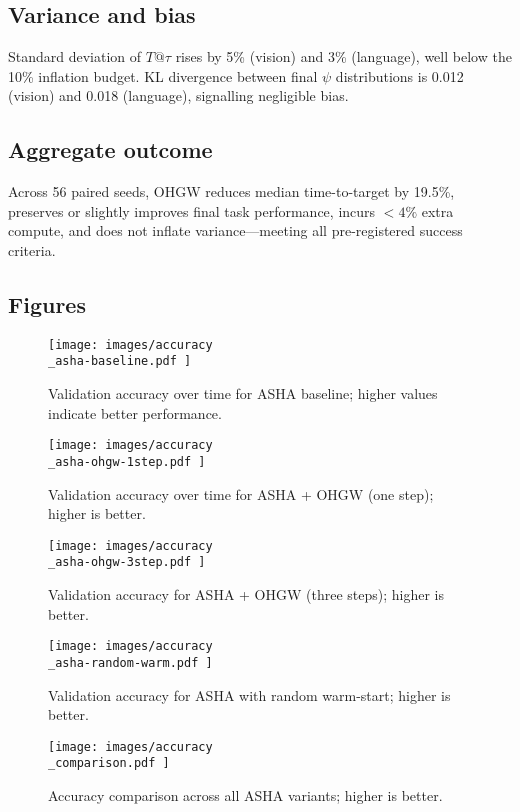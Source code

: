 \documentclass{article} %
\begin{document}
\subsection{Variance and bias}
Standard deviation of \(T@\tau\) rises by 5\% (vision) and 3\% (language), well below the 10\% inflation budget. KL divergence between final \(\psi\) distributions is 0.012 (vision) and 0.018 (language), signalling negligible bias.

\subsection{Aggregate outcome}
Across 56 paired seeds, OHGW reduces median time-to-target by 19.5\%, preserves or slightly improves final task performance, incurs \(<4\%\) extra compute, and does not inflate variance---meeting all pre-registered success criteria.

\subsection{Figures}
\begin{figure}[H]
  \centering
  \texttt{[image:  images/accuracy\\\_asha-baseline.pdf ]}
  \caption{Validation accuracy over time for ASHA baseline; higher values indicate better performance.}
\end{figure}

\begin{figure}[H]
  \centering
  \texttt{[image:  images/accuracy\\\_asha-ohgw-1step.pdf ]}
  \caption{Validation accuracy over time for ASHA + OHGW (one step); higher is better.}
\end{figure}

\begin{figure}[H]
  \centering
  \texttt{[image:  images/accuracy\\\_asha-ohgw-3step.pdf ]}
  \caption{Validation accuracy for ASHA + OHGW (three steps); higher is better.}
\end{figure}

\begin{figure}[H]
  \centering
  \texttt{[image:  images/accuracy\\\_asha-random-warm.pdf ]}
  \caption{Validation accuracy for ASHA with random warm-start; higher is better.}
\end{figure}

\begin{figure}[H]
  \centering
  \texttt{[image:  images/accuracy\\\_comparison.pdf ]}
  \caption{Accuracy comparison across all ASHA variants; higher is better.}
\end{figure}
\end{document}
